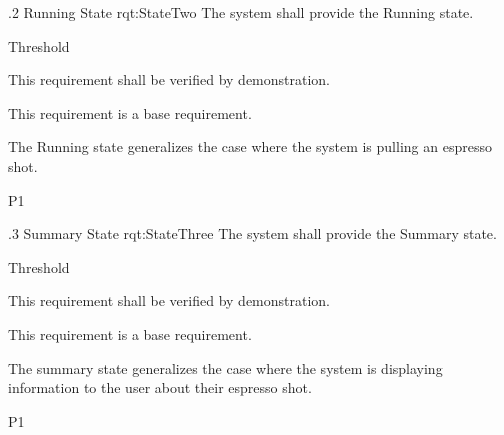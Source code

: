 \ONERQMTV
{\RqtNumberBase.2}
{Running State}
{rqt:StateTwo}
{The system shall provide the Running state.}
{
	\item [Phase 1] Threshold
}
{This requirement shall be verified by demonstration.}
{
	\item [N/A] This requirement is a base requirement.
}
{
	\item The Running state generalizes the case where the system is pulling an espresso shot.
}
{P1}


\ONERQMTV
{\RqtNumberBase.3}
{Summary State}
{rqt:StateThree}
{The system shall provide the Summary state.}
{
	\item [Phase 1] Threshold
}
{This requirement shall be verified by demonstration.}
{
	\item [N/A] This requirement is a base requirement.
}
{
	\item The summary state generalizes the case where the system is displaying information to the user about their espresso shot.
}
{P1}
